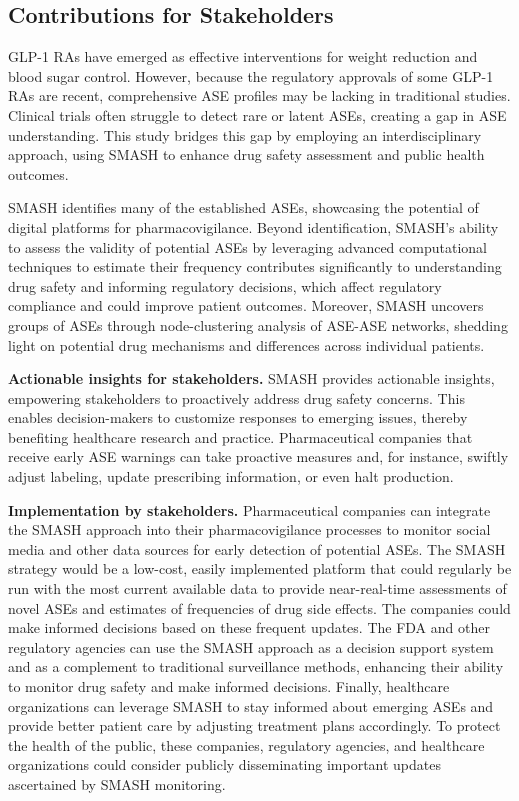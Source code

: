 \documentclass[referee,bst/sn-basic]{sn-jnl}%
\begin{document}
\subsection{Contributions for Stakeholders}

GLP-1 RAs have emerged as effective interventions for weight reduction and blood sugar control. 
However, because the regulatory approvals of some GLP-1 RAs are recent, comprehensive ASE profiles may be lacking in traditional studies. 
Clinical trials often struggle to detect rare or latent ASEs, creating a gap in ASE understanding. 
This study bridges this gap by employing an interdisciplinary approach, using SMASH to enhance drug safety assessment and public health outcomes.

SMASH identifies many of the established ASEs, showcasing the potential of digital platforms for pharmacovigilance. 
Beyond identification, SMASH's ability to assess the validity of potential ASEs by leveraging advanced computational techniques to estimate their frequency contributes significantly to understanding drug safety and informing regulatory decisions, which affect regulatory compliance and could improve patient outcomes.
Moreover, SMASH uncovers groups of ASEs through node-clustering analysis of ASE-ASE networks, shedding light on potential drug mechanisms and differences across individual patients.

\textbf{Actionable insights for stakeholders.}
SMASH provides actionable insights, empowering stakeholders to proactively address drug safety concerns. 
This enables decision-makers to customize responses to emerging issues, thereby benefiting healthcare research and practice.
Pharmaceutical companies that receive early ASE warnings can take proactive measures and, for instance,  swiftly adjust labeling, update prescribing information, or even halt production.

\textbf{Implementation by stakeholders.} 
Pharmaceutical companies can integrate the SMASH approach into their pharmacovigilance processes to monitor social media and other data sources for early detection of potential ASEs.
The SMASH strategy would be a low-cost, easily implemented platform that could regularly be run with the most current available data to provide near-real-time assessments of novel ASEs and estimates of frequencies of drug side effects. The companies could make informed decisions based on these frequent updates.
The FDA and other regulatory agencies can use the SMASH approach as a decision support system and as a 
complement to traditional surveillance methods, enhancing their ability to monitor drug safety and make informed decisions.
Finally, healthcare organizations can leverage SMASH to stay informed about emerging ASEs and provide better patient care by adjusting treatment plans accordingly.
To protect the health of the public, these companies, regulatory agencies, and healthcare organizations could consider publicly disseminating important updates ascertained by SMASH monitoring.
\end{document}
